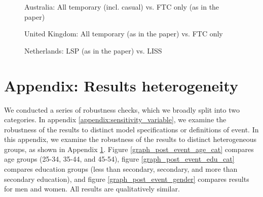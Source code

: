 \begin{sidewaysfigure}[!h]
    \caption{Australia: All temporary (incl. casual) vs. FTC only (as in the paper)}
    \label{graph_sensitivity_AU}
\end{sidewaysfigure}


\begin{sidewaysfigure}
    \caption{United Kingdom: All temporary (as in the paper) vs. FTC only}
    \label{graph_sensitivity_UK}
\end{sidewaysfigure}

\begin{sidewaysfigure}
    \caption{Netherlands: LSP (as in the paper) vs. LISS}
    \label{graph_sensitivity_NE}
\end{sidewaysfigure}



\clearpage
\setcounter{table}{0}
\setcounter{figure}{0}
\renewcommand*\thetable{\Alph{section}.\arabic{table}}
\renewcommand*\thefigure{\Alph{section}.\arabic{figure}}
\renewcommand{\theHfigure}{\Alph{section}.\arabic{table}}
\renewcommand{\theHtable}{\Alph{section}.\arabic{figure}}

\section{Appendix: Results heterogeneity}\label{appendix:sensitivity_heterogeneity}

We conducted a series of robustness checks, which we broadly split into two categories.  In appendix \ref{appendix:sensitivity_variable}, we examine the robustness of the results to distinct model specifications or definitions of event.  In this appendix, we examine the robustness of the results to distinct heterogeneous groups, as shown in Appendix \ref{appendix:sensitivity_heterogeneity}.  Figure \ref{graph_post_event_age_cat} compares age groups (25-34, 35-44, and 45-54), figure \ref{graph_post_event_edu_cat} compares education groups (less than secondary, secondary, and more than secondary education), and figure \ref{graph_post_event_gender} compares results for men and women.  All results are qualitatively similar.

